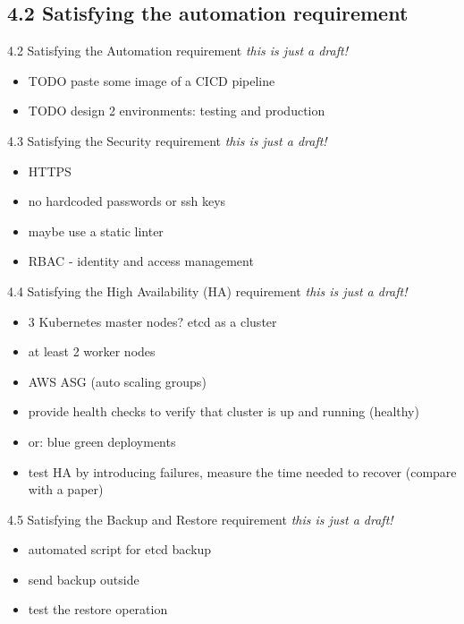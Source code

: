 \documentclass{beamer}
\begin{document}
\subsection{4.2 Satisfying the automation requirement}
\begin{frame}{4.2 Satisfying the Automation requirement}%
\textit{this is just a draft!}
\begin{itemize}
	\item TODO paste some image of a CICD pipeline
	\item TODO design 2 environments: testing and production 
\end{itemize}
\end{frame}
\begin{frame}{4.3 Satisfying the Security requirement}%
\textit{this is just a draft!}
\begin{itemize}
	\item HTTPS
	\item no hardcoded passwords or ssh keys
	\item maybe use a static linter 
	\item RBAC - identity and access management
\end{itemize}
\end{frame}
\begin{frame}{4.4 Satisfying the High Availability (HA) requirement}%
\textit{this is just a draft!}
\begin{itemize}
	\item 3 Kubernetes master nodes? etcd as a cluster
	\item at least 2 worker nodes
	\item AWS ASG (auto scaling groups)
	\item provide health checks to verify that cluster is up and running (healthy)
	\item or: blue green deployments
	\item test HA by introducing failures, measure the time needed to recover (compare with a paper)
\end{itemize}
\end{frame}

\begin{frame}{4.5 Satisfying the Backup and Restore  requirement}%
\textit{this is just a draft!}
\begin{itemize}
	\item automated script for etcd backup 
	\item send backup outside
	\item test the restore operation
\end{itemize}
\end{frame}
\end{document}
